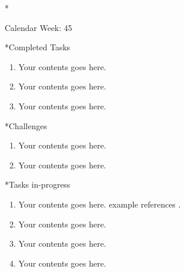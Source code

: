 \documentclass[11pt,a4paper]{article}
\begin{document}
\newpage
\begin{section}*{Calendar Week: 45 \hfill \date{06 November, 2020}}
 \begin{refsection}

       \begin{subsection}*{Completed Tasks}
             \begin{enumerate}
                   \item
                         Your contents goes here.
                   \item
                         Your contents goes here.
                   \item
                         Your contents goes here.
             \end{enumerate}
       \end{subsection}

       \begin{subsection}*{Challenges}
             \begin{enumerate}
                   \item
                         Your contents goes here.
                   \item
                         Your contents goes here.
             \end{enumerate}
       \end{subsection}

       \begin{subsection}*{Tasks in-progress}
             \begin{enumerate}
                   \item
                         Your contents goes here. example references \cite{DBLP:journals/corr/abs-1912-07383,DBLP:journals/candie/CarvalhoSVFBA19}.
                   \item
                         Your contents goes here.
                   \item
                         Your contents goes here.
                   \item
                         Your contents goes here.
             \end{enumerate}
       \end{subsection}

       \printbibliography
 \end{refsection}
\end{section}
\end{document}
